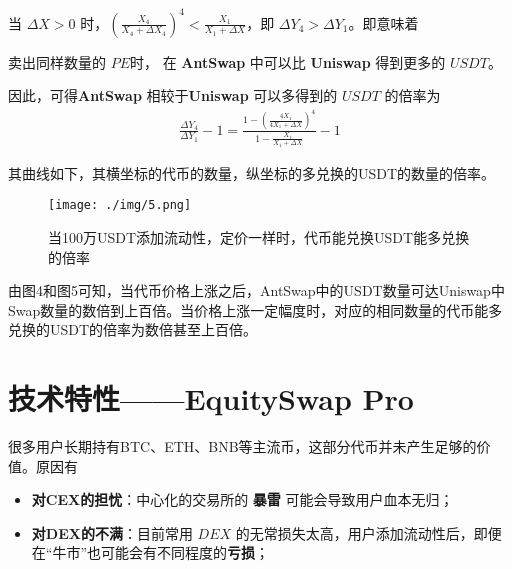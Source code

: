 \documentclass{article}
\begin{document}
当 $\Delta X > 0$ 时，$(\frac{X_4}{X_4+\Delta X_4})^4 < \frac{X_1}{X_1+\Delta X}$，即 $\Delta Y_4 > \Delta Y_1$。即意味着

卖出同样数量的 $PE$时， 在 \textbf{AntSwap} 中可以比 \textbf{Uniswap} 得到更多的 $USDT$。

因此，可得\textbf{AntSwap} 相较于\textbf{Uniswap} 可以多得到的 $USDT$ 的倍率为 
\begin{equation*}
\begin{split}
\frac{\Delta Y_4}{\Delta Y_1} - 1 = \frac{1- (\frac{4X_1}{4X_1 + \Delta X})^4}{1-\frac{X_1}{X_1 + \Delta X}} - 1
\end{split}
\end{equation*}


其曲线如下，其横坐标的代币的数量，纵坐标的多兑换的USDT的数量的倍率。

\begin{figure}[H]
\centering
\texttt{[image: ./img/5.png]}
\caption{\label{fig}当100万USDT添加流动性，定价一样时，代币能兑换USDT能多兑换的倍率}
\end{figure}

由图4和图5可知，当代币价格上涨之后，AntSwap中的USDT数量可达Uniswap中Swap数量的数倍到上百倍。当价格上涨一定幅度时，对应的相同数量的代币能多兑换的USDT的倍率为数倍甚至上百倍。








\section{技术特性——EquitySwap Pro}
很多用户长期持有BTC、ETH、BNB等主流币，这部分代币并未产生足够的价值。原因有
\begin{itemize}
  \item \textbf{对CEX的担忧}：中心化的交易所的 \textbf{暴雷} 可能会导致用户血本无归；
  \item \textbf{对DEX的不满}：目前常用 $DEX$ 的无常损失太高，用户添加流动性后，即便在“牛市”也可能会有不同程度的\textbf{亏损}；
\end{itemize}
\end{document}
